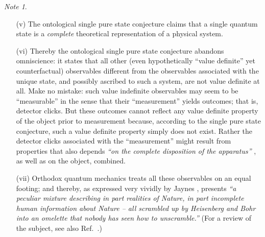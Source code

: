 \documentclass[%
  preprint,
 showpacs,
 showkeys,
 preprintnumbers,
 amsmath,amssymb,
 aps,
 prl,
  longbibliography,
 ]{revtex4-1}
\theoremstyle{definition}
\theoremstyle{remark}
\newtheorem*{note}{Note}
\begin{document}
\begin{note}
\begin{itemize}
\item[(v)]
The ontological single pure state conjecture
claims that a single quantum state is a {\em complete}
theoretical representation of a physical system.

\item[(vi)]
Thereby the ontological single pure state conjecture abandons omniscience:
it states that all other (even hypothetically ``value definite'' yet counterfactual) observables
different from the observables associated with the unique state,
and possibly
ascribed to such a system, are not value definite at all.
Make no mistake: such value indefinite observables may
seem to be ``measurable'' in the sense that their
``measurement'' yields outcomes; that is, detector clicks.
But these outcomes cannot reflect any value definite property of the object prior to measurement
because, according to the single pure state conjecture,
such a value definite property  simply does not exist.
Rather the detector clicks associated with the ``measurement'' might result
from  properties that also depends
{\em ``on the complete disposition  of the apparatus''} \cite{bell-66}, as well as on the object, combined.

\item[(vii)]
Orthodox quantum mechanics
treats all these observables on an equal footing;
and thereby,
as expressed very vividly by Jaynes \cite{jaynes-90},
presents
{\em ``a peculiar mixture describing
in part realities of Nature, in part incomplete human information about Nature -- all scrambled up
by Heisenberg and Bohr into an omelette that nobody has seen how to unscramble.''}
(For a review of the subject, see also
Ref.~\cite[Section A]{PhysRevA.86.012103}.)
\end{itemize}
\end{note}
\end{document}
